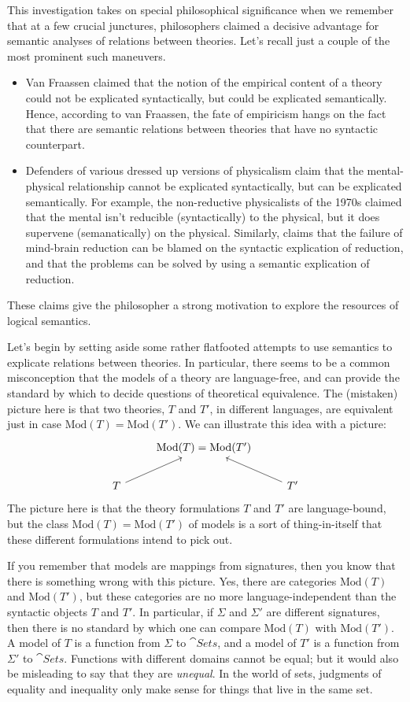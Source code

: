 This investigation takes on special philosophical significance when we
remember that at a few crucial junctures, philosophers claimed a
decisive advantage for semantic analyses of relations between
theories.  Let's recall just a couple of the most prominent such
maneuvers.
\begin{itemize}
\item Van Fraassen claimed that the notion of the empirical content of
  a theory could not be explicated syntactically, but could be
  explicated semantically.  Hence, according to van Fraassen, the fate
  of empiricism hangs on the fact that there are semantic relations
  between theories that have no syntactic counterpart.
\item Defenders of various dressed up versions of physicalism claim
  that the mental-physical relationship cannot be explicated
  syntactically, but can be explicated semantically.  For example, the
  non-reductive physicalists of the 1970s claimed that the mental
  isn't reducible (syntactically) to the physical, but it does
  supervene (semanatically) on the physical.  Similarly, \cite{bickle}
  claims that the failure of mind-brain reduction can be blamed on the
  syntactic explication of reduction, and that the problems can be
  solved by using a semantic explication of reduction.
\end{itemize}
These claims give the philosopher a strong motivation to explore the
resources of logical semantics.

Let's begin by setting aside some rather flatfooted attempts to use
semantics to explicate relations between theories.  In particular,
there seems to be a common misconception that the models of a theory
are language-free, and can provide the standard by which to decide
questions of theoretical equivalence.  The (mistaken) picture here is
that two theories, $T$ and $T'$, in different languages, are
equivalent just in case $\mathrm{Mod}(T)=\mathrm{Mod}(T')$.  We can
illustrate this idea with a picture:
\[ \begin{tikzcd}
    & \mathrm{Mod}(T)=\mathrm{Mod}(T') & \\
    T \arrow{ur} & & \arrow{ul} T' \end{tikzcd} \] The picture here is
that the theory formulations $T$ and $T'$ are language-bound, but the
class $\mathrm{Mod}(T)=\mathrm{Mod}(T')$ of models is a sort of
thing-in-itself that these different formulations intend to pick out.

If you remember that models are mappings from signatures, then you
know that there is something wrong with this picture.  Yes, there are
categories $\mathrm{Mod}(T)$ and $\mathrm{Mod}(T')$, but these
categories are no more language-independent than the syntactic objects
$T$ and $T'$.  In particular, if $\Sigma$ and $\Sigma '$ are different
signatures, then there is no standard by which one can compare
$\mathrm{Mod}(T)$ with $\mathrm{Mod}(T')$.  A model of $T$ is a
function from $\Sigma$ to $\cat{Sets}$, and a model of $T'$ is a
function from $\Sigma '$ to $\cat{Sets}$.  Functions with different
domains cannot be equal; but it would also be misleading to say that
they are {\it unequal}.  In the world of sets, judgments of equality
and inequality only make sense for things that live in the same set.

